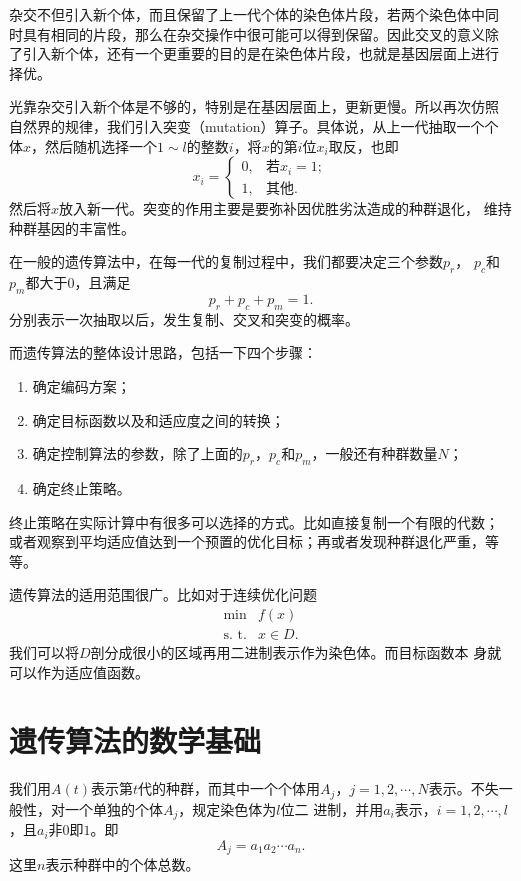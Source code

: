 杂交不但引入新个体，而且保留了上一代个体的染色体片段，若两个染色体中同
时具有相同的片段，那么在杂交操作中很可能可以得到保留。因此交叉的意义除
了引入新个体，还有一个更重要的目的是在染色体片段，也就是基因层面上进行
择优。

光靠杂交引入新个体是不够的，特别是在基因层面上，更新更慢。所以再次仿照
自然界的规律，我们引入突变（mutation）算子。具体说，从上一代抽取一个个
体$x$，然后随机选择一个$1 \sim l$的整数$i$，将$x$的第$i$位$x_i$取反，也即
$$
x_i = \left\{
\begin{array}{ll}
  0,& \mbox{若} x_i = 1; \\
  1,& \mbox{其他}.
\end{array}
\right.
$$
然后将$x$放入新一代。突变的作用主要是要弥补因优胜劣汰造成的种群退化，
维持种群基因的丰富性。

在一般的遗传算法中，在每一代的复制过程中，我们都要决定三个参数$p_r$，
$p_c$和$p_m$都大于$0$，且满足
$$
p_r + p_c + p_m = 1. 
$$
分别表示一次抽取以后，发生复制、交叉和突变的概率。

而遗传算法的整体设计思路，包括一下四个步骤：
\begin{enumerate}
\item 确定编码方案；
\item 确定目标函数以及和适应度之间的转换；
\item 确定控制算法的参数，除了上面的$p_r$，$p_c$和$p_m$，一般还有种群数量$N$；
\item 确定终止策略。
\end{enumerate}

终止策略在实际计算中有很多可以选择的方式。比如直接复制一个有限的代数；
或者观察到平均适应值达到一个预置的优化目标；再或者发现种群退化严重，等
等。

遗传算法的适用范围很广。比如对于连续优化问题
$$
\begin{array}{ll}
  \min & f(x) \\
  \mbox{s. t.}& x \in D.
\end{array}
$$
我们可以将$D$剖分成很小的区域再用二进制表示作为染色体。而目标函数本
身就可以作为适应值函数。

\section{遗传算法的数学基础}

我们用$A(t)$表示第$t$代的种群，而其中一个个体用$A_j$，$j = 1, 2,
\cdots, N$表示。不失一般性，对一个单独的个体$A_j$，规定染色体为$l$位二
进制，并用$a_i$表示，$i = 1, 2, \cdots, l$，且$a_i$非$0$即$1$。即
$$
A_j = a_1a_2\cdots a_n.
$$
这里$n$表示种群中的个体总数。

